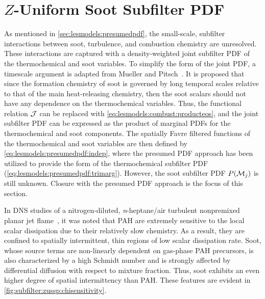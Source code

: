 \section{\texorpdfstring{$Z$}{Z}-Uniform Soot Subfilter PDF}
\label{sec:subfilter:zussp}

As mentioned in \cref{sec:lesmodels:presumedpdf}, the small-scale, subfilter interactions between soot, turbulence, and combustion chemistry are unresolved. These interactions are captured with a density-weighted joint subfilter PDF of the thermochemical and soot variables. To simplify the form of the joint PDF, a timescale argument is adapted from Mueller and Pitsch~\cite{subfilterpdf2011}. It is proposed that since the formation chemistry of soot is governed by long temporal scales relative to that of the main heat-releasing chemistry, then the soot scalars should not have any dependence on the thermochemical variables. Thus, the functional relation $\mathcal{J}$ can be replaced with \cref{eq:lesmodels:combust:producteos}, and the joint subfilter PDF can be expressed as the product of marginal PDFs for the thermochemical and soot components. The spatially Favre filtered functions of the thermochemical and soot variables are then defined by \cref{eq:lesmodels:presumedpdf:indep}, where the presumed PDF approach has been utilized to provide the form of the thermochemical subfilter PDF (\cref{eq:lesmodels:presumedpdf:trimarg}). However, the soot subfilter PDF $P(\mathcal{M}_j)$ is still unknown. Closure with the presumed PDF approach is the focus of this section.

In DNS studies of a nitrogen-diluted, \textit{n}-heptane/air turbulent nonpremixed planar jet flame~\cite{bisetti2012,attili2014,attili2015}, it was noted that PAH are extremely sensitive to the local scalar dissipation due to their relatively slow chemistry. As a result, they are confined to spatially intermittent, thin regions of low scalar dissipation rate. Soot, whose source terms are non-linearly dependent on gas-phase PAH precursors, is also characterized by a high Schmidt number and is strongly affected by differential diffusion with respect to mixture fraction. Thus, soot exhibits an even higher degree of spatial intermittency than PAH. These features are evident in \cref{fig:subfilter:zussp:chisensitivity}.

